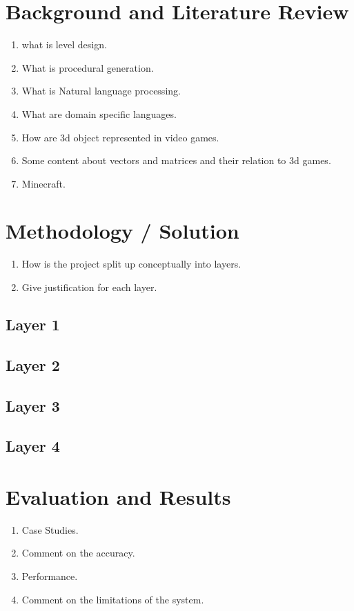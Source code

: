 \documentclass[11pt, a4paper]{article}
\begin{document}
\begin{flushleft}
\section*{Background and Literature Review}
\begin{enumerate}
    \item what is level design.
    \item What is procedural generation.
    \item What is Natural language processing.
    \item What are domain specific languages.
    \item How are 3d object represented in video games.
    \item Some content about vectors and matrices and their relation to 3d games.
    \item Minecraft.
\end{enumerate}

\section*{Methodology / Solution}
\begin{enumerate}
    \item How is the project split up conceptually into layers.
    \item Give justification for each layer.
\end{enumerate}

\subsection*{Layer 1}

\subsection*{Layer 2}

\subsection*{Layer 3}

\subsection*{Layer 4}


\section*{Evaluation and Results}
\begin{enumerate}
    \item Case Studies.
    \item Comment on the accuracy.
    \item Performance.
    \item Comment on the limitations of the system.
\end{enumerate}


\end{flushleft}
\end{document}
